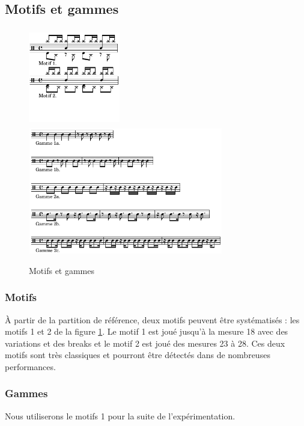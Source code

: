 \subsection*{Motifs et gammes}
\begin{figure}[h]
	\centering
	\includegraphics[height=43mm, width=40mm]{z_images/4_experimentations/2_experimentation_theorique/0_motifs_4-4_binaires.png}
	\includegraphics[height=55mm, width=85mm]{z_images/4_experimentations/2_experimentation_theorique/1_gammes_4-4_binaires.png}
	\caption{Motifs et gammes}
	\label{motifs}
\end{figure}
\subsubsection{Motifs}
À partir de la partition de référence, deux motifs peuvent être systématisés : les motifs 1 et 2 de la figure \ref{motifs}. Le motif 1 est joué jusqu’à la mesure 18 avec des variations et des breaks et le motif 2 est joué des mesures 23 à 28. Ces deux motifs sont très classiques et pourront être détectés dans de nombreuses performances.\\
\subsubsection{Gammes}
Nous utiliserons le motifs 1 pour la suite de l’expérimentation.
\newpage
